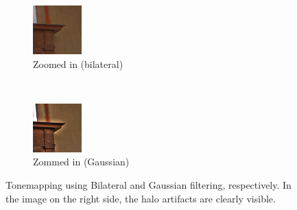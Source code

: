 \documentclass[a4spaper]{article}
\begin{document}
\begin{figure}[ht]
	\vspace{2mm}
	\begin{subfigure}[h]{0.48\textwidth}
		\centering
		\includegraphics[width=\textwidth]{tonemap_bilateral_5_0-12_200_zoom}
		\caption*{Zoomed in (bilateral)}
	\end{subfigure}
	~ 
	\begin{subfigure}[h]{0.48\textwidth}
		\centering
		\includegraphics[width=\textwidth]{tonemap_gaussian_5_10_zoom}
		\caption*{Zommed in (Gaussian)}
	\end{subfigure}
\caption{Tonemapping using Bilateral and Gaussian filtering, respectively. In the image on the right side, the halo artifacts are clearly visible.}
\label{fig:tonemap-gauss-bilateral}
\end{figure}
\end{document}
